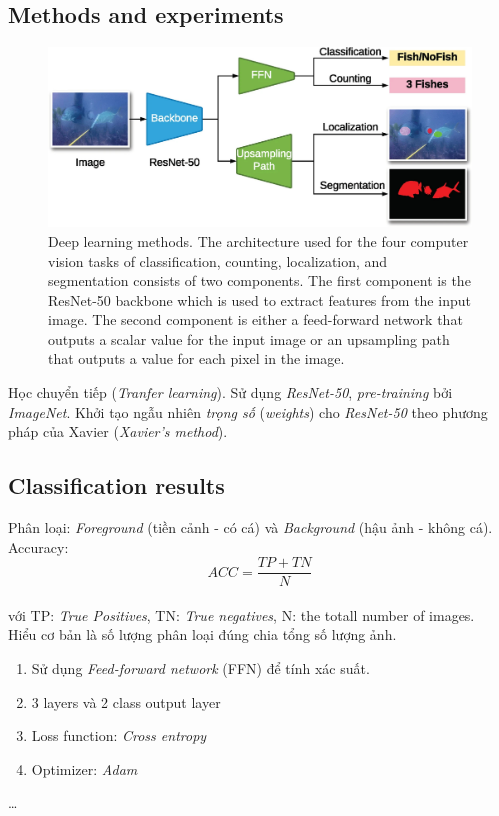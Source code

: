 \documentclass{article}
\begin{document}
        \subsection{Methods and experiments}
        \begin{figure}[ht!]
            \centering
            \includegraphics[width = \linewidth]{fig3.jpg}
            \caption{Deep learning methods. The architecture used for the four computer vision tasks of classification, counting, localization, and segmentation consists of two components. The first component is the ResNet-50 backbone which is used to extract features from the input image. The second component is either a feed-forward network that outputs a scalar value for the input image or an upsampling path that outputs a value for each pixel in the image.}
            \label{fig3}
        \end{figure}
        
        Học chuyển tiếp (\textit{Tranfer learning}). Sử dụng \textit{ResNet-50}, \textit{pre-training} bởi \textit{ImageNet}. Khởi tạo ngẫu nhiên \textit{trọng số} (\textit{weights}) cho \textit{ResNet-50} theo phương pháp của Xavier (\textit{Xavier's method}).

        \subsection{Classification results}
        Phân loại: \textit{Foreground} (tiền cảnh - có cá) và \textit{Background} (hậu ảnh - không cá).\\
        Accuracy: $$ACC = \frac{TP+TN}{N}$$
        \\với TP: \textit{True Positives}, TN: \textit{True negatives}, N: the totall number of images. \\Hiểu cơ bản là số lượng phân loại đúng chia tổng số lượng ảnh.
        \begin{enumerate}
            \item Sử dụng \textit{Feed-forward network} (FFN) để tính xác suất.
            \item 3 layers và 2 class output layer
            \item Loss function: \textit{Cross entropy}
            \item Optimizer: \textit{Adam}
        \end{enumerate}
        \ldots
\end{document}
